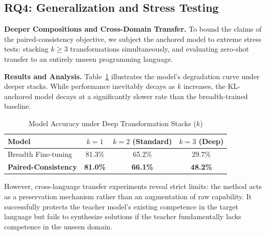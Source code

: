 \subsection{RQ4: Generalization and Stress Testing}
\label{subsec:rq4}

\textbf{Deeper Compositions and Cross-Domain Transfer.} To bound the claims of the paired-consistency objective, we subject the anchored model to extreme stress tests: stacking $k \geq 3$ transformations simultaneously, and evaluating zero-shot transfer to an entirely unseen programming language.

\textbf{Results and Analysis.} Table~\ref{tab:rq4_stress} illustrates the model's degradation curve under deeper stacks. While performance inevitably decays as $k$ increases, the KL-anchored model decays at a significantly slower rate than the breadth-trained baseline. 

\begin{table}[h]
\centering
\caption{Model Accuracy under Deep Transformation Stacks ($k$)}
\label{tab:rq4_stress}
\begin{tabular}{@{}lccc@{}}
\toprule
\textbf{Model}              & \textbf{$k=1$} & \textbf{$k=2$ (Standard)} & \textbf{$k=3$ (Deep)} \\ \midrule
Breadth Fine-tuning         & 81.3\%         & 65.2\%                    & 29.7\%                \\
\textbf{Paired-Consistency} & \textbf{81.0\%}& \textbf{66.1\%}           & \textbf{48.2\%}       \\ \bottomrule
\end{tabular}
\end{table}

However, cross-language transfer experiments reveal strict limits: the method acts as a preservation mechanism rather than an augmentation of raw capability. It successfully protects the teacher model's existing competence in the target language but fails to synthesize solutions if the teacher fundamentally lacks competence in the unseen domain.